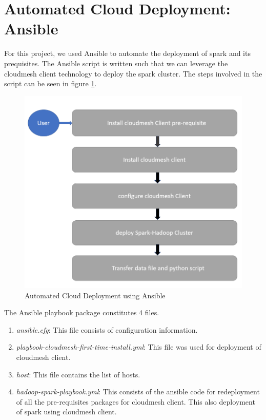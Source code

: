 \documentclass[9pt,twocolumn,twoside]{../../styles/osajnl}
\begin{document}
\section{Automated Cloud Deployment: Ansible}
For this project, we used Ansible to automate the deployment of spark and its prequisites. The Ansible script is written such that we can leverage the cloudmesh client technology to deploy the spark cluster. The steps involved in the script can be seen in figure \ref{fig:ansible}.

\begin{figure}[h]
\centering
\includegraphics[scale = 0.28]{images/auto_deploy}
\caption{Automated Cloud Deployment using Ansible}
\label{fig:ansible}
\end{figure}


The Ansible playbook package constitutes 4 files.
\begin{enumerate}
\item \textit{ansible.cfg}: This file consists of configuration information.
\item \textit{playbook-cloudmesh-first-time-install.yml}: This file was used for deployment of cloudmesh client.
\item \textit{host}: This file contains the list of hosts.
\item \textit{hadoop-spark-playbook.yml}: This consists of the ansible code for redeployment of all the pre-requisites packages for cloudmesh client. This also deployment of spark using cloudmesh client.
\end{enumerate}
\end{document}
